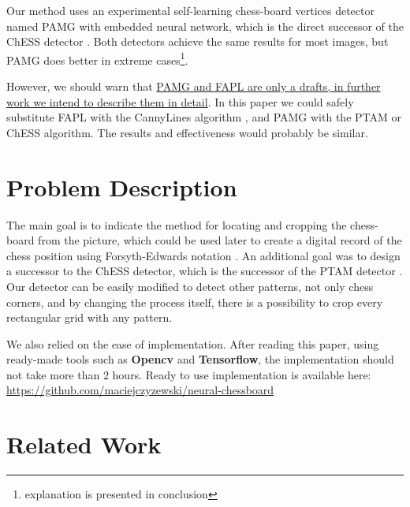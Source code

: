 \documentclass[letterpaper, 12pt]{article}
\begin{document}
Our method uses an experimental self-learning chess-board vertices detector named
PAMG with embedded neural network, which is the direct successor of the ChESS detector \cite{DBLP:journals/corr/abs-1301-5491}.
Both detectors achieve the same results for most images, but PAMG does better in
extreme cases\footnote{explanation is presented in conclusion}.

However, we should warn that \ul{PAMG and FAPL are only a drafts, in further work
we intend to describe them in detail}. In this paper we could safely
substitute FAPL with the CannyLines algorithm \cite{lu2015cannylines}, and PAMG
with the PTAM or ChESS algorithm. The results and effectiveness would probably be similar.

\section{Problem Description}

The main goal is to indicate the method for locating and cropping the
chess-board from the picture, which could be used later to create a digital record of the chess position using Forsyth-Edwards notation \cite{edwards1994portable}.
An additional goal was to design a successor to the ChESS detector, which is the
successor of the PTAM detector \cite{klein2007parallel}.
Our detector can be easily modified to detect other patterns, not only chess
corners, and by changing the process itself, there is a possibility to crop every rectangular grid with any pattern.

We also relied on the ease of implementation. After reading this paper, using
ready-made tools such as \textbf{Opencv} and \textbf{Tensorflow}, the
implementation should not take more than 2 hours. Ready to use implementation is
available here: \url{https://github.com/maciejczyzewski/neural-chessboard}

\section{Related Work}
\end{document}
